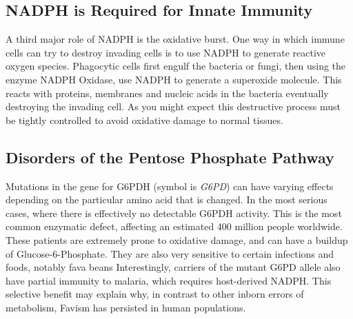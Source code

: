 \documentclass{tufte-handout}
\begin{document}
\subsection{NADPH is Required for Innate Immunity}

A third major role of NADPH is the oxidative burst.  One way in which immune cells can try to destroy invading cells is to use NADPH  to generate reactive oxygen species.  Phagocytic cells first engulf the bacteria or fungi, then using the enzyme NADPH Oxidase, use NADPH to generate a superoxide molecule.  This reacts with proteins, membranes and nucleic acids in the bacteria eventually destroying the invading cell.  As you might expect this destructive process must be tightly controlled to avoid oxidative damage to normal tissues.

\subsection{Disorders of the Pentose Phosphate Pathway}

Mutations in the gene for G6PDH (symbol is \textit{G6PD}) can have varying effects depending on the particular amino acid that is changed.  In the most serious cases, where there is effectively no detectable G6PDH activity.  This is the most common enzymatic defect, affecting an estimated 400 million people worldwide.  These patients are extremely prone to oxidative damage, and can have a buildup of Glucose-6-Phosphate.  They are also very sensitive to certain infections and foods, notably fava beans  Interestingly, carriers of the mutant G6PD allele also have partial immunity to malaria, which requires host-derived NADPH.  This selective benefit may explain why, in contrast to other inborn errors of metabolism, Favism has persisted in human populations.
\end{document}

